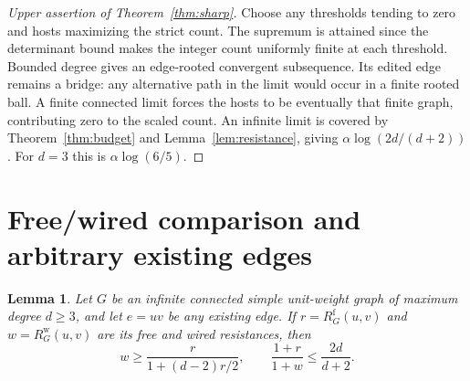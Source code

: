 \documentclass[11pt]{article}
\newtheorem{lemma}[theorem]{Lemma}
\begin{document}
\begin{proof}[Upper assertion of Theorem~\ref{thm:sharp}]
Choose any thresholds tending to zero and hosts maximizing the strict
count. The supremum is attained since the determinant bound makes the
integer count uniformly finite at each threshold. Bounded degree gives
an edge-rooted convergent subsequence. Its edited edge remains a bridge:
any alternative path in the limit would occur in a finite rooted ball.
A finite connected limit forces the hosts to be eventually that finite
graph, contributing zero to the scaled count. An infinite limit is
covered by Theorem~\ref{thm:budget} and Lemma~\ref{lem:resistance}, giving
$\alpha\log(2d/(d+2))$. For $d=3$ this is $\alpha\log(6/5)$.
\end{proof}

\section{Free/wired comparison and arbitrary existing edges}\label{sec:free-wired}
\begin{lemma}\label{lem:free-wired}
Let $G$ be an infinite connected simple unit-weight graph of maximum
degree $d\ge3$, and let $e=uv$ be any existing edge. If
$r=R^{\mathrm f}_G(u,v)$ and $w=R^{\mathrm w}_G(u,v)$ are its free
and wired resistances, then
\[
 w\ge\frac{r}{1+(d-2)r/2},\qquad
               \frac{1+r}{1+w}\le\frac{2d}{d+2}.
\]
\end{lemma}
\end{document}
